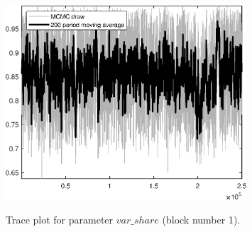 \begin{figure}[H]
\centering
  \includegraphics[width=0.8\textwidth]{directed_search_est/graphs/TracePlot_var_share_blck_1}\\
    \caption{Trace plot for parameter $var\_share$ (block number 1).}
\end{figure}
